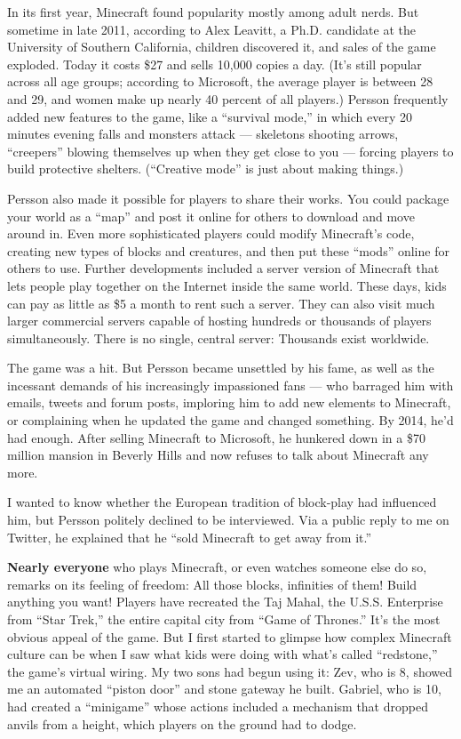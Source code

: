 In its first year, Minecraft found popularity mostly among adult nerds.
But sometime in late 2011, according to Alex Leavitt, a Ph.D. candidate
at the University of Southern California, children discovered it, and
sales of the game exploded. Today it costs \$27 and sells 10,000 copies
a day. (It's still popular across all age groups; according to
Microsoft, the average player is between 28 and 29, and women make up
nearly 40 percent of all players.) Persson frequently added new features
to the game, like a ``survival mode,'' in which every 20 minutes evening
falls and monsters attack --- skeletons shooting arrows, ``creepers''
blowing themselves up when they get close to you --- forcing players to
build protective shelters. (``Creative mode'' is just about making
things.)

Persson also made it possible for players to share their works. You
could package your world as a ``map'' and post it online for others to
download and move around in. Even more sophisticated players could
modify Minecraft's code, creating new types of blocks and creatures, and
then put these ``mods'' online for others to use. Further developments
included a server version of Minecraft that lets people play together on
the Internet inside the same world. These days, kids can pay as little
as \$5 a month to rent such a server. They can also visit much larger
commercial servers capable of hosting hundreds or thousands of players
simultaneously. There is no single, central server: Thousands exist
worldwide.

The game was a hit. But Persson became unsettled by his fame, as well as
the incessant demands of his increasingly impassioned fans --- who
barraged him with emails, tweets and forum posts, imploring him to add
new elements to Minecraft, or complaining when he updated the game and
changed something. By 2014, he'd had enough. After selling Minecraft to
Microsoft, he hunkered down in a \$70 million mansion in Beverly Hills
and now refuses to talk about Minecraft any more.

I wanted to know whether the European tradition of block-play had
influenced him, but Persson politely declined to be interviewed. Via a
public reply to me on Twitter, he explained that he ``sold Minecraft to
get away from it.''

\textbf{Nearly everyone} who plays Minecraft, or even watches someone
else do so, remarks on its feeling of freedom: All those blocks,
infinities of them! Build anything you want! Players have re­created the
Taj Mahal, the U.S.S. Enterprise from ``Star Trek,'' the entire capital
city from ``Game of Thrones.'' It's the most obvious appeal of the game.
But I first started to glimpse how complex Minecraft culture can be when
I saw what kids were doing with what's called ``redstone,'' the game's
virtual wiring. My two sons had begun using it: Zev, who is 8, showed me
an automated ``piston door'' and stone gateway he built. Gabriel, who is
10, had created a ``minigame'' whose actions included a mechanism that
dropped anvils from a height, which players on the ground had to dodge.

